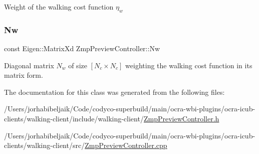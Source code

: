 Weight of the walking cost function $ \eta_w $ \hypertarget{classZmpPreviewController_a5e85354a1a7c3f2a8e265dbe7367051c}{}\label{classZmpPreviewController_a5e85354a1a7c3f2a8e265dbe7367051c} 
\subsubsection{\texorpdfstring{Nw}{Nw}}
{\footnotesize\ttfamily const Eigen\+::\+Matrix\+Xd Zmp\+Preview\+Controller\+::\+Nw\hspace{0.3cm}{\ttfamily [private]}}

Diagonal matrix $N_w$ of size $[N_c \times N_c]$ weighting the walking cost function in its matrix form. 

The documentation for this class was generated from the following files\+:\begin{DoxyCompactItemize}
\item 
/\+Users/jorhabibeljaik/\+Code/codyco-\/superbuild/main/ocra-\/wbi-\/plugins/ocra-\/icub-\/clients/walking-\/client/include/walking-\/client/\hyperlink{ZmpPreviewController_8h}{Zmp\+Preview\+Controller.\+h}\item 
/\+Users/jorhabibeljaik/\+Code/codyco-\/superbuild/main/ocra-\/wbi-\/plugins/ocra-\/icub-\/clients/walking-\/client/src/\hyperlink{ZmpPreviewController_8cpp}{Zmp\+Preview\+Controller.\+cpp}\end{DoxyCompactItemize}
